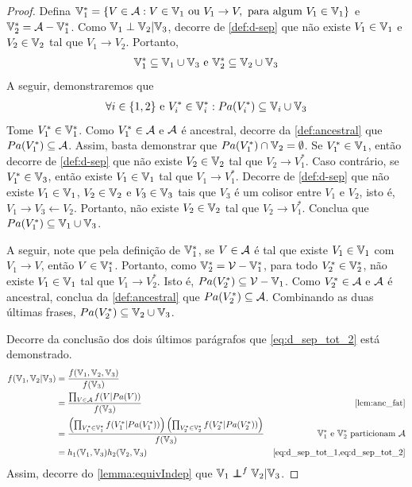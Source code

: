 \begin{proof}
 Defina ${\mathbb V}^*_1 = \{V \in {\mathcal A}: 
 V \in {\mathbb V}_1 \text{ ou } V_1 \rightarrow V,
 \text{ para algum } V_1 \in {\mathbb V}_1\}$ e
 ${\mathbb V}^*_2 = {\mathcal A} - {\mathbb V}^*_1$.
 Como ${\mathbb V}_1 \perp {\mathbb V}_2 | {\mathbb V}_3$, decorre de
 \cref{def:d-sep} que não existe
 $V_1 \in {\mathbb V}_1$ e $V_2 \in {\mathbb V}_2$ tal que
 $V_1 \rightarrow V_2$. Portanto,
 \begin{align}
  \label{eq:d_sep_tot_1}
  {\mathbb V}^*_1 \subseteq {\mathbb V}_1 \cup {\mathbb V}_3 \text{ e }
  {\mathbb V}^*_2 \subseteq {\mathbb V}_2 \cup {\mathbb V}_3
 \end{align}
 A seguir, demonstraremos que
 \begin{align}
  \label{eq:d_sep_tot_2}
  \forall i \in \{1,2\} \text{ e }
  V^*_i \in {\mathbb V}^*_i:
  Pa(V^*_i) \subseteq {\mathbb V}_i \cup {\mathbb V}_3
 \end{align}
 Tome $V^*_1 \in {\mathbb V}^*_1$.
 Como $V^*_1 \in {\mathcal A}$ e ${\mathcal A}$ é ancestral,
 decorre da \cref{def:ancestral} que
 $Pa(V^*_1) \subseteq {\mathcal A}$.
 Assim, basta demonstrar que 
 $Pa(V^*_1) \cap {\mathbb V}_2 = \emptyset$. 
 Se $V^*_1 \in {\mathbb V}_1$, então decorre de
 \cref{def:d-sep} que não existe
 $V_2 \in {\mathbb V}_2$ tal que $V_2 \rightarrow V^*_1$.
 Caso contrário, se $V^*_1 \in {\mathbb V}_3$,
 então existe $V_1 \in {\mathbb V}_1$ tal que
 $V_1 \rightarrow V^*_1$.
 Decorre de \cref{def:d-sep} que não existe 
 $V_1 \in {\mathbb V}_1$, $V_2 \in {\mathbb V}_2$ e
 $V_3 \in {\mathbb V}_3$ tais que $V_3$ é
 um colisor entre $V_1$ e $V_2$, isto é,
 $V_1 \rightarrow V_3 \leftarrow V_2$.
 Portanto, não existe $V_2 \in {\mathbb V}_2$ tal que
 $V_2 \rightarrow V^*_1$.
 Conclua que $Pa(V^*_1) \subseteq {\mathbb V}_1 \cup {\mathbb V}_3$.
 
 A seguir, note que 
 pela definição de ${\mathbb V}^*_1$, 
 se $V \in {\mathcal A}$ é tal que
 existe $V_1 \in {\mathbb V}_1$ com
 $V_1 \rightarrow V$, então
 $V \in {\mathbb V}^*_1$. Portanto,
 como ${\mathbb V}^*_2 = {\mathcal V} - {\mathbb V}^*_1$, 
 para todo $V^*_2 \in {\mathbb V}^*_2$,
 não existe $V_1 \in {\mathbb V}_1$ tal que
 $V_1 \rightarrow V^*_2$.
 Isto é, $Pa(V^*_2) \subseteq {\mathcal V} - {\mathbb V}_1$.
 Como $V^*_2 \in {\mathcal A}$ e ${\mathcal A}$ é ancestral,
 conclua da \cref{def:ancestral} que
 $Pa(V^*_2) \subseteq {\mathcal A}$.
 Combinando as duas últimas frases,
 $Pa(V^*_2) \subseteq {\mathbb V}_2 \cup {\mathbb V}_3$.
 
 Decorre da conclusão dos dois últimos parágrafos que
 \cref{eq:d_sep_tot_2} está demonstrado.
 \begin{align*}
  f(\V_1,\V_2|\V_3)
  &= \frac{f(\V_1,\V_2,\V_3)}{f(\V_3)} \\
  &= \frac{\prod_{V \in \sA}f(V|Pa(V))}
  {f(\V_3)} 
  & \text{\cref{lem:anc_fat}} \\
  &= \frac{\left(\prod_{V^*_1 \in \V^*_1}
  f(V^*_1|Pa(V^*_1))\right)
  \left(\prod_{V^*_2 \in \V^*_2}
  f(V^*_2|Pa(V^*_2))\right)}
  {f(\V_3)} 
  & \V^*_1 \text{ e } \V^*_2 \text{ particionam } \sA \\
  &= h_1(\V_1, \V_3) h_2(\V_2, \V_3)
  & \text{\cref{eq:d_sep_tot_1,eq:d_sep_tot_2}}
 \end{align*}
 Assim, decorre do \cref{lemma:equivIndep} que
 ${\mathbb V}_1 \perp\!\!\!\!\perp^f {\mathbb V}_2 | {\mathbb V}_3$.
\end{proof}

